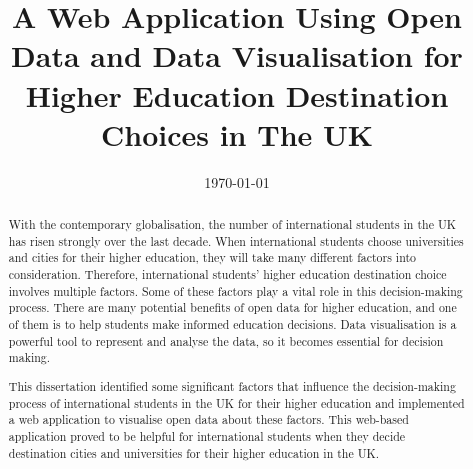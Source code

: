 \documentclass[oneside]{ecsthesis}      %
\begin{document}
\frontmatter
\title      {A Web Application Using Open Data and Data Visualisation for Higher Education Destination Choices in The UK}
            
     
\addresses  {\groupname\\\deptname\\\univname}
\date       {\today}
\subject    {}
\keywords   {}

\maketitle

\begin{abstract}
With the contemporary globalisation, the number of international students in the UK has risen strongly over the last decade. When international students choose universities and cities for their higher education, they will take many different factors into consideration. Therefore, international students’ higher education destination choice involves multiple factors. Some of these factors play a vital role in this decision-making process. There are many potential benefits of open data for higher education, and one of them is to help students make informed education decisions.  Data visualisation is a powerful tool to represent and analyse the data, so it becomes essential for decision making. 

This dissertation identified some significant factors that influence the decision-making process of international students in the UK for their higher education and implemented a web application to visualise open data about these factors. This web-based application proved to be helpful for international students when they decide destination cities and universities for their higher education in the UK.

\end{abstract}
\tableofcontents
\listoffigures
\listoftables
\end{document}
